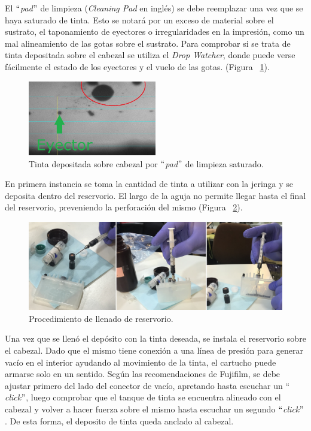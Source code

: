 El $``$\textit{pad}$"$ de limpieza (\textit{Cleaning Pad} en inglés) se debe reemplazar una vez que se haya saturado de tinta. Esto se notará por un exceso de material sobre el sustrato, el taponamiento de eyectores o irregularidades en la impresión, como un mal alineamiento de las gotas sobre el sustrato. Para comprobar si se trata de tinta depositada sobre el cabezal se utiliza el \textit{Drop Watcher}, donde puede verse fácilmente el estado de los eyectores y el vuelo de las gotas. (Figura ~\ref{fig:Figura_suciedad_cabezal}).

\begin{figure}[H]
  \centering
    \includegraphics[width=0.5\textwidth]{Figuras/Figura_suciedad_cabezal}
  \caption{Tinta depositada sobre cabezal por $``$\textit{pad}$"$ de limpieza saturado.}
  \label{fig:Figura_suciedad_cabezal}
\end{figure}

En primera instancia se toma la cantidad de tinta a utilizar con la jeringa y se deposita dentro del reservorio. El largo de la aguja no permite llegar hasta el final del reservorio, preveniendo la perforación del mismo (Figura ~\ref{fig:Figura_carga_tinta}).

\begin{figure}[H]
  \centering
    \includegraphics[width=1\textwidth]{Figuras/Figura_carga_tinta}
  \caption{Procedimiento de llenado de reservorio.}
  \label{fig:Figura_carga_tinta}
\end{figure}

Una vez que se llenó el depósito con la tinta deseada, se instala el reservorio sobre el cabezal. Dado que el mismo tiene conexión a una línea de presión para generar vacío en el interior ayudando al movimiento de la tinta, el cartucho puede armarse solo en un sentido. Según las recomendaciones de Fujifilm, se debe ajustar primero del lado del conector de vacío, apretando hasta escuchar un $``$\textit{click}$"$, luego comprobar que el tanque de tinta se encuentra alineado con el cabezal y volver a hacer fuerza sobre el mismo hasta escuchar un segundo $``$\textit{click}$"$. De esta forma, el deposito de tinta queda anclado al cabezal.

